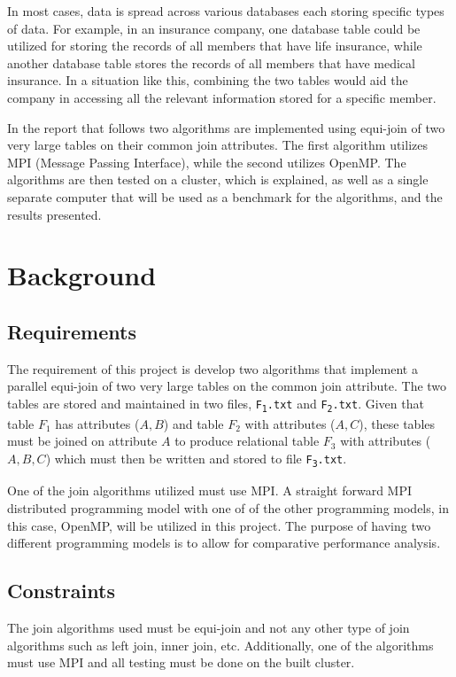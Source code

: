 \documentclass[10pt, conference]{IEEEtran}
\def\code#1{\texttt{#1}}
\begin{document}
In most cases, data is spread across various databases each storing specific types of data. For example, in an insurance company, one database table could be utilized for storing the records of all members that have life insurance, while another database table stores the records of all members that have medical insurance. In a situation like this, combining the two tables would aid the company in accessing all the relevant information stored for a specific member.

In the report that follows two algorithms are implemented using equi-join of two very large tables on their common join attributes. The first algorithm utilizes MPI (Message Passing Interface), while the second utilizes OpenMP. The algorithms are then tested on a cluster, which is explained, as well as a single separate computer that will be used as a benchmark for the algorithms, and the results presented.

\section{Background}
\label{sec: Background}

\subsection{Requirements}
\label{sec: Requirements}
The requirement of this project is develop two algorithms that implement a parallel equi-join of two very large tables on the common join attribute. The two tables are stored and maintained in two files, \code{F\textsubscript{1}.txt} and \code{F\textsubscript{2}.txt}. Given that table $F_1$ has attributes ($A,B$) and table $F_2$ with attributes ($A,C$), these tables must be joined on attribute $A$ to produce relational table $F_3$ with attributes ($A,B,C$) which must then be written and stored to file \code{F\textsubscript{3}.txt}.

One of the join algorithms utilized must use MPI. A straight forward MPI distributed programming model with one of of the other programming models, in this case, OpenMP, will be utilized in this project. The purpose of having two different programming models is to allow for comparative performance analysis.

\subsection{Constraints}
\label{sec: Constraints}
The join algorithms used must be equi-join and not any other type of join algorithms such as left join, inner join, etc. Additionally, one of the algorithms must use MPI and all testing must be done on the built cluster.
\end{document}
